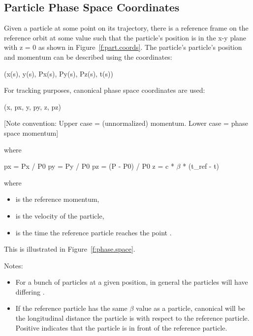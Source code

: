 \documentclass{hitec}
\begin{document}
\subsection{Particle Phase Space Coordinates}

Given a particle at some point on its trajectory, there is a reference frame on the reference orbit
at some  value such that the particle's position is in the x-y plane with z = 0 as shown
in Figure~\ref{f:part.coords}. The
particle's particle's position and momentum  can be described using the coordinates:
\begin{code}
    (x(s), y(s), Px(s), Py(s), Pz(s), t(s))
\end{code}

For tracking purposes, canonical phase space coordinates are used:
\begin{code}
    (x, px, y, py, z, pz)   
\end{code}
[Note convention: Upper case  = (unnormalized) momentum. Lower case  = phase space momentum]

where
\begin{code}
    px = Px / P0
    py = Py / P0
    pz = (P - P0) / P0
    z  = c * $\beta$ * (t_ref - t)
\end{code}

where 
\begin{itemize}
\item {} is the reference momentum, 
\item \vn{$\beta$} is the velocity of the particle, 
\item {} is the time the reference particle reaches the point .
\end{itemize}

This is illustrated in Figure~\ref{f:phase.space}.

Notes:
\begin{itemize}
\item For a bunch of particles at a given  position, in general the particles will have differing .
\item If the reference particle has the same $\beta$ value as a particle, canonical  will be the longitudinal distance 
the particle is with respect to the reference particle. Positive  indicates that the particle
is in front of the reference particle.
\end{itemize}
\end{document}
